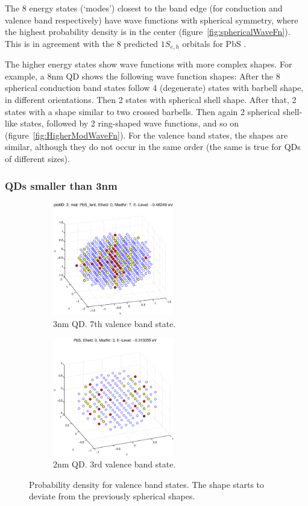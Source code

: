 The 8 energy states (`modes') closest to the band edge (for conduction and valence band respectively) have wave functions with spherical symmetry, where the highest probability density is in the center (figure~\ref{fig:sphericalWaveFn}). This is in agreement with the 8 predicted $1S_{e,h}$ orbitals for PbS \cite[p.410]{Talapin}.
	
The higher energy states show wave functions with more complex shapes. For example, a 8nm QD shows the following wave function shapes: After the 8 spherical conduction band states follow 4 (degenerate) states with barbell shape, in different orientations. Then 2 states with spherical shell shape. After that, 2 states with a shape similar to two crossed barbells. Then again 2 spherical shell-like states, followed by 2 ring-shaped wave functions, and so on (figure~\ref{fig:HigherModWaveFn}). For the valence band states, the shapes are similar, although they do not occur in the same order (the same is true for QDs of different sizes).

\subsubsection{QDs smaller than 3nm}	

\begin{figure}[htbp]
	\centering
	\begin{subfigure}{200px}
		\includegraphics[width=200px]{Fig/Plots/r15VBmod7}
		\caption{3nm QD. 7th valence band state.}
	\end{subfigure}
	\begin{subfigure}{200px}
		\includegraphics[width=200px]{Fig/Plots/r1VBmod3}
		\caption{2nm QD. 3rd valence band state.}
	\end{subfigure}
	\caption{Probability density for valence band states. The shape starts to deviate from the previously spherical shapes.}
	\label{fig:asymWaveFn}
\end{figure}


